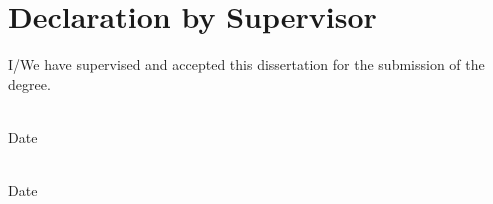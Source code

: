 \chapter*{Declaration by Supervisor}

\begin{flushleft}
	I/We have supervised and accepted this dissertation for the submission of the degree. \\

	\vspace{15mm}
	
	{\makebox[6.5cm]{\dotfill}} \hfill {\makebox[5cm]{\dotfill}}  \\ 
	\supervisorA \hfill Date \\
	
	
	\vspace{15mm}
	
	{\makebox[6.5cm]{\dotfill}} \hfill {\makebox[5cm]{\dotfill}}  \\ 
	\supervisorB \hfill Date \\
	
\end{flushleft}
